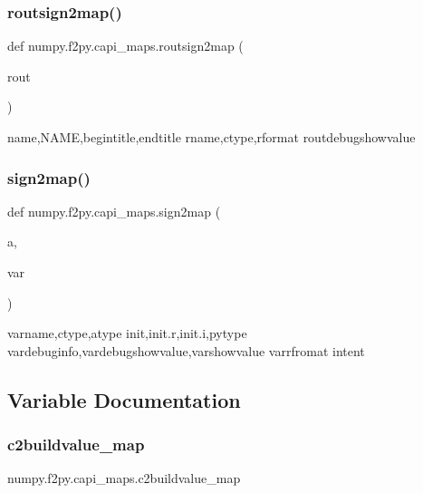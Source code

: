 \subsubsection{\texorpdfstring{routsign2map()}{routsign2map()}}
{\footnotesize\ttfamily def numpy.\+f2py.\+capi\+\_\+maps.\+routsign2map (\begin{DoxyParamCaption}\item[{}]{rout }\end{DoxyParamCaption})}

\begin{DoxyVerb}name,NAME,begintitle,endtitle
rname,ctype,rformat
routdebugshowvalue
\end{DoxyVerb}
 \mbox{\label{namespacenumpy_1_1f2py_1_1capi__maps_a7453a2f2b126df1f9bcfcd858e7a496c}} 
\subsubsection{\texorpdfstring{sign2map()}{sign2map()}}
{\footnotesize\ttfamily def numpy.\+f2py.\+capi\+\_\+maps.\+sign2map (\begin{DoxyParamCaption}\item[{}]{a,  }\item[{}]{var }\end{DoxyParamCaption})}

\begin{DoxyVerb}varname,ctype,atype
init,init.r,init.i,pytype
vardebuginfo,vardebugshowvalue,varshowvalue
varrfromat
intent
\end{DoxyVerb}
 

\subsection{Variable Documentation}
\mbox{\label{namespacenumpy_1_1f2py_1_1capi__maps_aaaeda771639f9a9dbc52c2ab5bad1d24}} 
\subsubsection{\texorpdfstring{c2buildvalue\+\_\+map}{c2buildvalue\_map}}
{\footnotesize\ttfamily numpy.\+f2py.\+capi\+\_\+maps.\+c2buildvalue\+\_\+map}

